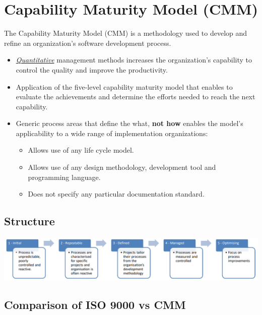 \documentclass{article}
\newcommand{\worddef}[1]{\hyperref[sec:reference]{\textit{#1}}}
\begin{document}
\section{Capability Maturity Model (CMM)}
\begin{flushleft}
The Capability Maturity Model (CMM) is a methodology used to develop and refine an organization's software development process.
\end{flushleft}
\begin{itemize}
  \item \worddef{Quantitative} management methods increases the organization's capability to control the quality and improve the productivity.
  \item Application of the five-level capability maturity model that enables to evaluate the achievements and determine the efforts needed to reach the next capability.
  \item Generic process areas that define the what, \textbf{not how} enables the model's applicability to a wide range of implementation organizations:
  \begin{itemize}
    \item Allows use of any life cycle model.
    \item Allows use of any design methodology, development tool and programming language.
    \item Does not specify any particular documentation standard.
  \end{itemize}
\end{itemize}

\subsection{Structure}

\begin{center}
  \includegraphics[scale=0.5]{cmm_structur.png}
\end{center}

\pagebreak

\subsection{Comparison of ISO 9000 vs CMM}
\end{document}
